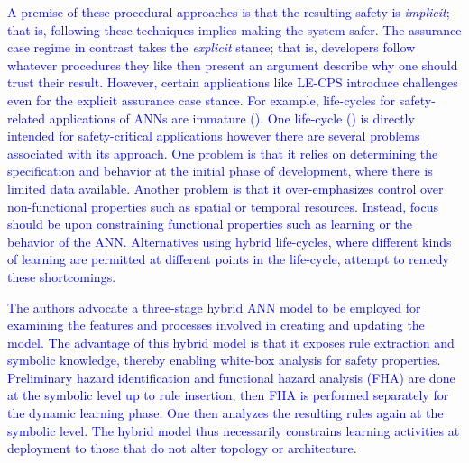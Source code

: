 \textcolor{blue}{
A premise of these procedural approaches is that the resulting safety is {\em implicit}; that is, following these techniques implies making the system safer.  The assurance case regime in contrast takes the {\em explicit\/} stance; that is, developers follow whatever procedures they like then present an argument describe why one should trust their result.  However, certain applications like LE-CPS introduce challenges even for the explicit assurance case stance. For example, life-cycles for safety-related applications of ANNs are immature (\cite{SafetyANN}).  One life-cycle (\cite{Rodvoid}) is directly intended for safety-critical applications however there are several problems associated with its approach. One problem is that it relies on determining the specification and behavior at the initial phase of development, where there is limited data available.  Another problem is that it over-emphasizes control over non-functional properties such as spatial or temporal resources. Instead, focus should be upon constraining functional properties such as learning or the behavior of the ANN.  Alternatives using hybrid life-cycles, where different kinds of learning are permitted at different points in the life-cycle, attempt to remedy these shortcomings. 
}

\textcolor{blue}{The authors \cite{SafetyANN} advocate a three-stage hybrid ANN model to be employed for examining the features and processes involved in creating and updating the model.  The advantage of this hybrid model is that it exposes rule extraction and symbolic knowledge, thereby enabling white-box analysis for safety properties.  Preliminary hazard identification and functional hazard analysis (FHA) are done at the symbolic level up to rule insertion, then FHA is performed separately for the dynamic learning phase.  One then analyzes the resulting rules again at the symbolic level.  The hybrid model thus necessarily constrains learning activities at deployment to those that do not alter topology or architecture.}


